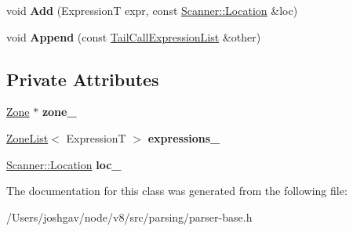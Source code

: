 \begin{DoxyCompactItemize}
\item 
void {\bfseries Add} (ExpressionT expr, const \hyperlink{structv8_1_1internal_1_1_scanner_1_1_location}{Scanner\+::\+Location} \&loc)\hypertarget{classv8_1_1internal_1_1_parser_base_1_1_tail_call_expression_list_a2a997fd9c26fdd4f7b1ebc6c8ed1d43d}{}\label{classv8_1_1internal_1_1_parser_base_1_1_tail_call_expression_list_a2a997fd9c26fdd4f7b1ebc6c8ed1d43d}

\item 
void {\bfseries Append} (const \hyperlink{classv8_1_1internal_1_1_parser_base_1_1_tail_call_expression_list}{Tail\+Call\+Expression\+List} \&other)\hypertarget{classv8_1_1internal_1_1_parser_base_1_1_tail_call_expression_list_a6863087e3703391ea4900f2ac7110f7f}{}\label{classv8_1_1internal_1_1_parser_base_1_1_tail_call_expression_list_a6863087e3703391ea4900f2ac7110f7f}

\end{DoxyCompactItemize}
\subsection*{Private Attributes}
\begin{DoxyCompactItemize}
\item 
\hyperlink{classv8_1_1internal_1_1_zone}{Zone} $\ast$ {\bfseries zone\+\_\+}\hypertarget{classv8_1_1internal_1_1_parser_base_1_1_tail_call_expression_list_a75e8d3631f66ff026baec334a7e11897}{}\label{classv8_1_1internal_1_1_parser_base_1_1_tail_call_expression_list_a75e8d3631f66ff026baec334a7e11897}

\item 
\hyperlink{classv8_1_1internal_1_1_zone_list}{Zone\+List}$<$ ExpressionT $>$ {\bfseries expressions\+\_\+}\hypertarget{classv8_1_1internal_1_1_parser_base_1_1_tail_call_expression_list_a01b6e2a79a5710dffa472acd01eec092}{}\label{classv8_1_1internal_1_1_parser_base_1_1_tail_call_expression_list_a01b6e2a79a5710dffa472acd01eec092}

\item 
\hyperlink{structv8_1_1internal_1_1_scanner_1_1_location}{Scanner\+::\+Location} {\bfseries loc\+\_\+}\hypertarget{classv8_1_1internal_1_1_parser_base_1_1_tail_call_expression_list_aea511703af71493c9e7d21db462ac1a8}{}\label{classv8_1_1internal_1_1_parser_base_1_1_tail_call_expression_list_aea511703af71493c9e7d21db462ac1a8}

\end{DoxyCompactItemize}


The documentation for this class was generated from the following file\+:\begin{DoxyCompactItemize}
\item 
/\+Users/joshgav/node/v8/src/parsing/parser-\/base.\+h\end{DoxyCompactItemize}
